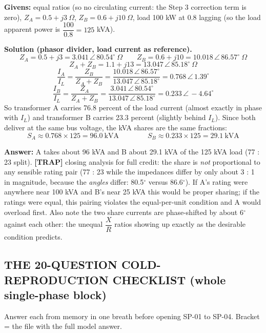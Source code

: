 \documentclass[11pt]{article}
\newcommand{\trap}[1]{\vspace{2pt}\textbf{\color{red}[TRAP]} #1}
\begin{document}
\textbf{Givens:} equal ratios (so no circulating current: the Step 3 correction term is zero), $Z_A = 0.5 + j3\ \Omega$, $Z_B = 0.6 + j10\ \Omega$, load 100 kW at 0.8 lagging (so the load apparent power is $\dfrac{100}{0.8} = 125$ kVA).

\textbf{Solution (phasor divider, load current as reference).}
\[
Z_A = 0.5 + j3 = 3.041\,\angle\,80.54^{\circ}\ \Omega
\qquad
Z_B = 0.6 + j10 = 10.018\,\angle\,86.57^{\circ}\ \Omega
\]
\[
Z_A + Z_B = 1.1 + j13 = 13.047\,\angle\,85.18^{\circ}\ \Omega
\]
\[
\frac{I_A}{I_L} = \frac{Z_B}{Z_A + Z_B} = \frac{10.018\,\angle\,86.57^{\circ}}{13.047\,\angle\,85.18^{\circ}} = 0.768\,\angle\,1.39^{\circ}
\]
\[
\frac{I_B}{I_L} = \frac{Z_A}{Z_A + Z_B} = \frac{3.041\,\angle\,80.54^{\circ}}{13.047\,\angle\,85.18^{\circ}} = 0.233\,\angle\,-4.64^{\circ}
\]
So transformer A carries 76.8 percent of the load current (almost exactly in phase with $I_L$) and transformer B carries 23.3 percent (slightly behind $I_L$). Since both deliver at the same bus voltage, the kVA shares are the same fractions:
\[
S_A \approx 0.768 \times 125 = 96.0\ \text{kVA}
\qquad\qquad
S_B \approx 0.233 \times 125 = 29.1\ \text{kVA}
\]

\textbf{Answer:} A takes about 96 kVA and B about 29.1 kVA of the 125 kVA load (77 : 23 split). \trap{closing analysis for full credit: the share is \emph{not} proportional to any sensible rating pair (77 : 23 while the impedances differ by only about 3 : 1 in magnitude, because the \emph{angles} differ: 80.5$^\circ$ versus 86.6$^\circ$). If A's rating were anywhere near 100 kVA and B's near 25 kVA this would be proper sharing; if the ratings were equal, this pairing violates the equal-per-unit condition and A would overload first. Also note the two share currents are phase-shifted by about 6$^\circ$ against each other: the unequal $\dfrac{X}{R}$ ratios showing up exactly as the desirable condition predicts.}

\hrulefill
\subsection*{\color{copper}THE 20-QUESTION COLD-REPRODUCTION CHECKLIST (whole single-phase block)}

Answer each from memory in one breath before opening SP-01 to SP-04. Bracket = the file with the full model answer.
\end{document}
